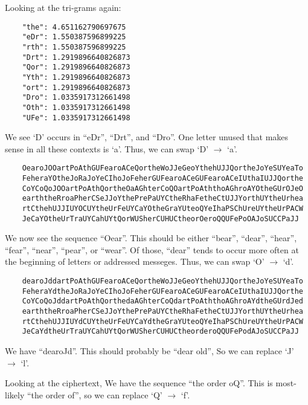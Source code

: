 \begin{Answer}
  \noindent
  Looking at the tri-grams again:
  
  \begin{Verbatim}
    "the": 4.651162790697675
    "eDr": 1.550387596899225
    "rth": 1.550387596899225
    "Drt": 1.2919896640826873
    "Qor": 1.2919896640826873
    "Yth": 1.2919896640826873
    "ort": 1.2919896640826873
    "Dro": 1.0335917312661498
    "Oth": 1.0335917312661498
    "UFe": 1.0335917312661498
  \end{Verbatim}

  \noindent
  We see `D' occurs in ``eDr'', ``Drt'', and ``Dro''.
  One letter unused that makes sense in all these contexts is `a'.
  Thus, we can swap `D' $\rightarrow$ `a'.

  \begin{Verbatim}
    OearoJOOartPoAthGUFearoACeQortheWoJJeGeoYthehUJJQortheJoYeSUYeaTo
    FeheraYOtheJoRaJoYeCIhoJoFeherGUFearoACeGUFearoACeIUthaIUJJQorthe
    CoYCoQoJOOartPoAthQortheOaAGhterCoQOartPoAththoAGhroAYOtheGUrOJeO
    earththeRroaPherCSeJJoYthePrePaUYCtheRhaFetheCtUJJYorthUYtheUrhea
    rtCthehUJJIUYOCUYtheUrFeUYCaYOtheGraYUteoQYeIhaPSChUreUYtheUrPACW
    JeCaYOtheUrTraUYCahUYtQorWUSherCUHUCtheorOeroQQUFePoOAJoSUCCPaJJ
  \end{Verbatim}

  \noindent
  We now see the sequence ``Oear''.
  This should be either ``bear'', ``dear'', ``hear'', ``fear'', ``near'', ``pear'', or ``wear''.
  Of those, ``dear'' tends to occur more often at the beginning of letters or addressed messeges.
  Thus, we can swap `O' $\rightarrow$ `d'. 

  \begin{Verbatim}
    dearoJddartPoAthGUFearoACeQortheWoJJeGeoYthehUJJQortheJoYeSUYeaTo
    FeheraYdtheJoRaJoYeCIhoJoFeherGUFearoACeGUFearoACeIUthaIUJJQorthe
    CoYCoQoJddartPoAthQorthedaAGhterCoQdartPoAththoAGhroAYdtheGUrdJed
    earththeRroaPherCSeJJoYthePrePaUYCtheRhaFetheCtUJJYorthUYtheUrhea
    rtCthehUJJIUYdCUYtheUrFeUYCaYdtheGraYUteoQYeIhaPSChUreUYtheUrPACW
    JeCaYdtheUrTraUYCahUYtQorWUSherCUHUCtheorderoQQUFePodAJoSUCCPaJJ
  \end{Verbatim}

  \noindent
  We have ``dearoJd''. This should probably be ``dear old'',
  So we can replace `J' $\rightarrow$ `l'.

  \noindent
  Looking at the ciphertext,
  We have the sequence ``the order oQ''.
  This is most-likely ``the order of'',
  so we can replace `Q' $\rightarrow$ `f'.



\end{Answer}
